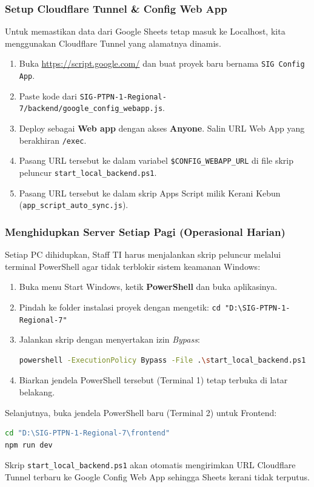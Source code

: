 \documentclass[12pt, a4paper]{article}
\begin{document}
\subsubsection{Setup Cloudflare Tunnel \& Config Web App}
Untuk memastikan data dari Google Sheets tetap masuk ke Localhost, kita menggunakan Cloudflare Tunnel yang alamatnya dinamis.
\begin{enumerate}
    \item Buka \url{https://script.google.com/} dan buat proyek baru bernama \texttt{SIG Config App}.
    \item Paste kode dari \texttt{SIG-PTPN-1-Regional-7/backend/google\_config\_webapp.js}.
    \item Deploy sebagai \textbf{Web app} dengan akses \textbf{Anyone}. Salin URL Web App yang berakhiran \texttt{/exec}.
    \item Pasang URL tersebut ke dalam variabel \texttt{\$CONFIG\_WEBAPP\_URL} di file skrip peluncur \texttt{start\_local\_backend.ps1}.
    \item Pasang URL tersebut ke dalam skrip Apps Script milik Kerani Kebun (\texttt{app\_script\_auto\_sync.js}).
\end{enumerate}

\subsubsection{Menghidupkan Server Setiap Pagi (Operasional Harian)}
Setiap PC dihidupkan, Staff TI harus menjalankan skrip peluncur melalui terminal PowerShell agar tidak terblokir sistem keamanan Windows:
\begin{enumerate}
    \item Buka menu Start Windows, ketik \textbf{PowerShell} dan buka aplikasinya.
    \item Pindah ke folder instalasi proyek dengan mengetik: \texttt{cd "D:\textbackslash SIG-PTPN-1-Regional-7"}
    \item Jalankan skrip dengan menyertakan izin \textit{Bypass}:
    \begin{lstlisting}[language=bash]
powershell -ExecutionPolicy Bypass -File .\start_local_backend.ps1
    \end{lstlisting}
    \item Biarkan jendela PowerShell tersebut (Terminal 1) tetap terbuka di latar belakang.
\end{enumerate}

Selanjutnya, buka jendela PowerShell baru (Terminal 2) untuk Frontend:
\begin{lstlisting}[language=bash]
cd "D:\SIG-PTPN-1-Regional-7\frontend"
npm run dev
\end{lstlisting}
Skrip \texttt{start\_local\_backend.ps1} akan otomatis mengirimkan URL Cloudflare Tunnel terbaru ke Google Config Web App sehingga Sheets kerani tidak terputus.
\end{document}
